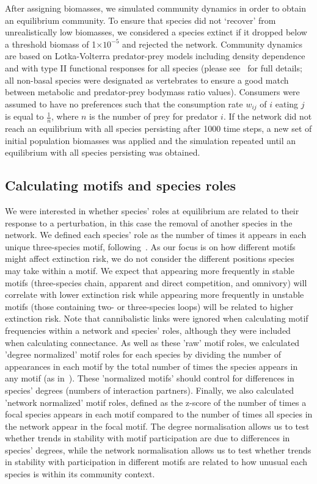 \documentclass[12pt]{article}
\begin{document}
		After assigning biomasses, we simulated community dynamics in order to obtain an equilibrium community. To ensure that species did not `recover' from unrealistically low biomasses, we considered a species extinct if it dropped below a threshold biomass of 1$\times10^{-5}$ and rejected the network. Community dynamics are based on Lotka-Volterra predator-prey models including density dependence and with type II functional responses for all species (please see~\citet{Delmas2017} for full details; all non-basal species were designated as vertebrates to ensure a good match between metabolic and predator-prey bodymass ratio values). Consumers were assumed to have no preferences such that the consumption rate $w_{ij}$ of $i$ eating $j$ is equal to $\frac{1}{n}$, where $n$ is the number of prey for predator $i$. If the network did not reach an equilibrium with all species persisting after 1000 time steps, a new set of initial population biomasses was applied and the simulation repeated until an equilibrium with all species persisting was obtained. 


	\subsection*{Calculating motifs and species roles}


		We were interested in whether species' roles at equilibrium are related to their response to a perturbation, in this case the removal of another species in the network. We defined each species' role as the number of times it appears in each unique three-species motif, following~\citet{Stouffer2012,Cirtwill2015}. As our focus is on how different motifs might affect extinction risk, we do not consider the different positions species may take within a motif. We expect that appearing more frequently in stable motifs (three-species chain, apparent and direct competition, and omnivory) will correlate with lower extinction risk while appearing more frequently in unstable motifs (those containing two- or three-species loops) will be related to higher extinction risk.	Note that cannibalistic links were ignored when calculating motif frequencies within a network and species' roles, although they were included when calculating connectance. As well as these 'raw' motif roles, we calculated 'degree normalized' motif roles for each species by dividing the number of appearances in each motif by the total number of times the species appears in any motif (as in~\citet{Cirtwill2015}). These 'normalized motifs' should control for differences in species' degrees (numbers of interaction partners). Finally, we also calculated 'network normalized' motif roles, defined as the z-score of the number of times a focal species appears in each motif compared to the number of times all species in the network appear in the focal motif.
		The degree normalisation allows us to test whether trends in stability with motif participation are due to differences in species' degrees, while the network normalisation allows us to test whether trends in stability with participation in different motifs are related to how unusual each species is within its community context.
\end{document}
